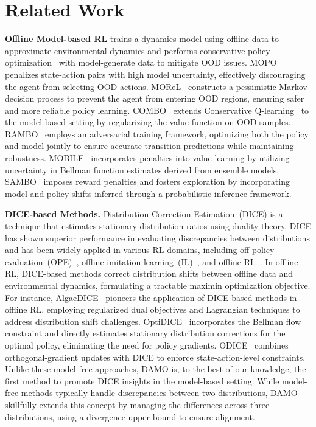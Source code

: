 \section{Related Work}
\textbf{Offline Model-based RL} trains a dynamics model using offline data to approximate environmental dynamics and performs conservative policy optimization~\cite{lu2021revisiting} with model-generate data to mitigate OOD issues. 
    MOPO~\cite{mopo} penalizes state-action pairs with high model uncertainty, effectively discouraging the agent from selecting OOD actions. 
    MOReL~\cite{morel} constructs a pessimistic Markov decision process to prevent the agent from entering OOD regions, ensuring safer and more reliable policy learning. 
    COMBO~\cite{combo} extends Conservative Q-learning~\cite{kumar2020conservative} to the model-based setting by regularizing the value function on OOD samples.
    RAMBO~\cite{rambo} employs an adversarial training framework, optimizing both the policy and model jointly to ensure accurate transition predictions while maintaining robustness. 
    MOBILE~\cite{mobile} incorporates penalties into value learning by utilizing uncertainty in Bellman function estimates derived from ensemble models.
    SAMBO~\cite{luo2024sambo} imposes reward penalties and fosters exploration by incorporating model and policy shifts inferred through a probabilistic inference framework.

    \textbf{DICE-based Methods.} Distribution Correction Estimation~(DICE) is a technique that estimates stationary distribution ratios using duality theory.
    DICE has shown superior performance in evaluating discrepancies between distributions and has been widely applied in various RL domains, including off-policy evaluation~(OPE)~\cite{nachum2019dualdice}, offline imitation learning~(IL)~\cite{ma2022smodice}, and offline RL~\cite{algaedice}. 
    In offline RL, DICE-based methods correct distribution shifts between offline data and environmental dynamics, formulating a tractable maximin optimization objective. 
    For instance, AlgaeDICE~\cite{algaedice} pioneers the application of DICE-based methods in offline RL, employing regularized dual objectives and Lagrangian techniques to address distribution shift challenges. 
    OptiDICE~\cite{optidice} incorporates the Bellman flow constraint and directly estimates stationary distribution corrections for the optimal policy, eliminating the need for policy gradients. 
    ODICE~\cite{odice} combines orthogonal-gradient updates with DICE to enforce state-action-level constraints. 
    Unlike these model-free approaches, DAMO is, to the best of our knowledge, the first method to promote DICE insights in the model-based setting. 
    While model-free methods typically handle discrepancies between two distributions, DAMO skillfully extends this concept by managing the differences across three distributions, using a divergence upper bound to ensure alignment.

